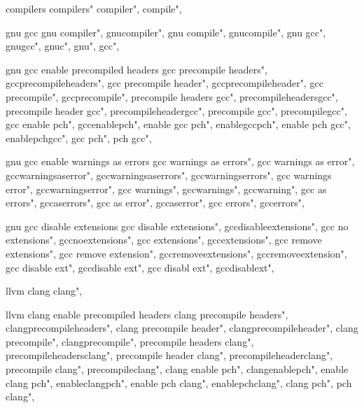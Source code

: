          compilers 
        compilers"
        compiler",
        compile",
        
         gnu gcc
        gnu compiler",
        gnucompiler",
        gnu compile",
        gnucompile",
        gnu gcc",
        gnugcc",
        gnuc",
        gnu",
        gcc",
        
         gnu gcc enable precompiled headers
        gcc precompile headers",  
        gccprecompileheaders",  
        gcc precompile header",  
        gccprecompileheader",  
        gcc precompile",  
        gccprecompile",  
        precompile headers gcc",  
        precompileheadersgcc",  
        precompile header gcc",  
        precompileheadergcc",  
        precompile gcc",  
        precompilegcc",  
        gcc enable pch",  
        gccenablepch",  
        enable gcc pch",  
        enablegccpch",  
        enable pch gcc",  
        enablepchgcc",  
        gcc pch",  
        pch gcc",  
        
         gnu gcc enable warnings as errors
        gcc warnings as errors", 
        gcc warnings as error", 
        gccwarningsaserror", 
        gccwarningsaserrors", 
        gccwarningserrors", 
        gcc warnings error", 
        gccwarningserror", 
        gcc warnings", 
        gccwarnings", 
        gccwarning", 
        gcc as errors", 
        gccaserrors", 
        gcc as error", 
        gccaserror", 
        gcc errors", 
        gccerrors", 
        
         gnu gcc disable extensions 
        gcc disable extensions", 
        gccdisableextensions", 
        gcc no extensions", 
        gccnoextensions", 
        gcc extensions", 
        gccextensions", 
        gcc remove extensions", 
        gcc remove extension", 
        gccremoveextensions", 
        gccremoveextension", 
        gcc disable ext", 
        gccdisable ext", 
        gcc disabl ext", 
        gccdisablext", 
        
         llvm clang 
        clang",  
        
         llvm clang enable precompiled headers 
        clang precompile headers",  
        clangprecompileheaders",  
        clang precompile header",  
        clangprecompileheader",  
        clang precompile",  
        clangprecompile",  
        precompile headers clang",  
        precompileheadersclang",  
        precompile header clang",  
        precompileheaderclang",  
        precompile clang",  
        precompileclang",  
        clang enable pch",  
        clangenablepch",  
        enable clang pch",  
        enableclangpch",  
        enable pch clang",  
        enablepchclang",  
        clang pch",  
        pch clang",  
        
